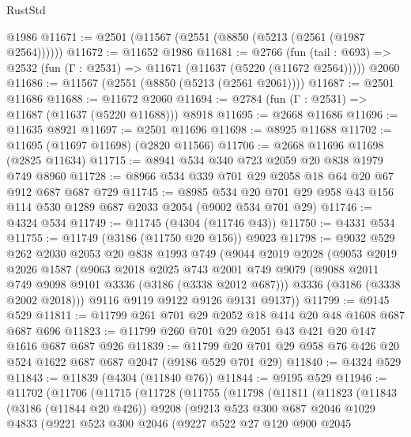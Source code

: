 \begin{lexlean}{RustStd}
\begin{coremodule}
{\begin{coremodule}
{{{{{{{{{{{{{{{{{{{{    @1986
@11671 := @2501 (@11567 (@2551 (@8850 (@5213 (@2561 (@1987 @2564))))))
@11672 := @11652 @1986
@11681 := @2766
    (fun (tail : @693) => @2532 (fun (Γ : @2531) => @11671 (@11637 (@5220 (@11672 @2564)))))
    @2060
@11686 := @11567 (@2551 (@8850 (@5213 (@2561 @2061))))
@11687 := @2501 @11686
@11688 := @11672 @2060
@11694 := @2784 (fun (Γ : @2531) => @11687 (@11637 (@5220 @11688))) @8918
@11695 := @2668 @11686
@11696 := @11635 @8921
@11697 := @2501 @11696
@11698 := @8925 @11688
@11702 := @11695 (@11697 @11698) (@2820 @11566)
@11706 := @2668 @11696 @11698 (@2825 @11634)
@11715 := @8941 @534 @340 @723 @2059 @20 @838 @1979 @749 @8960
@11728 := @8966 @534 @339 @701 @29 @2058 @18 @64 @20 @67 @912 @687 @687 @729
@11745 := @8985
    @534
    @20
    @701
    @29
    @958
    @43
    @156
    @114
    @530
    @1289
    @687
    @2033
    @2054
    (@9002 @534 @701 @29)
@11746 := @4324 @534
@11749 := @11745 (@4304 (@11746 @43))
@11750 := @4331 @534
@11755 := @11749 (@3186 (@11750 @20 @156)) @9023
@11798 := @9032
    @529
    @262
    @2030
    @2053
    @20
    @838
    @1993
    @749
    (@9044
      @2019
      @2028
      (@9053
        @2019
        @2026
        @1587
        (@9063
          @2018
          @2025
          @743
          @2001
          @749
          @9079
          (@9088 @2011 @749 @9098 @9101 @3336 (@3186 (@3338 @2012 @687)))
          @3336
          (@3186 (@3338 @2002 @2018)))
        @9116
        @9119
        @9122
        @9126
        @9131
        @9137))
@11799 := @9145 @529
@11811 := @11799 @261 @701 @29 @2052 @18 @414 @20 @48 @1608 @687 @687 @696
@11823 := @11799 @260 @701 @29 @2051 @43 @421 @20 @147 @1616 @687 @687 @926
@11839 := @11799 @20 @701 @29 @958 @76 @426 @20 @524 @1622 @687 @687 @2047 (@9186 @529 @701 @29)
@11840 := @4324 @529
@11843 := @11839 (@4304 (@11840 @76))
@11844 := @9195 @529
@11946 := @11702
    (@11706
      (@11715
        (@11728
          (@11755
            (@11798
              (@11811
                (@11823
                  (@11843
                    (@3186 (@11844 @20 @426))
                    @9208
                    (@9213
                      @523
                      @300
                      @687
                      @2046
                      @1029
                      @4833
                      (@9221
                        @523
                        @300
                        @2046
                        (@9227
                          @522
                          @27
                          @120
                          @900
                          @2045
}}}}}}}}}}}}}}}}}}}}
\end{coremodule}}
\end{coremodule}
\end{lexlean}
